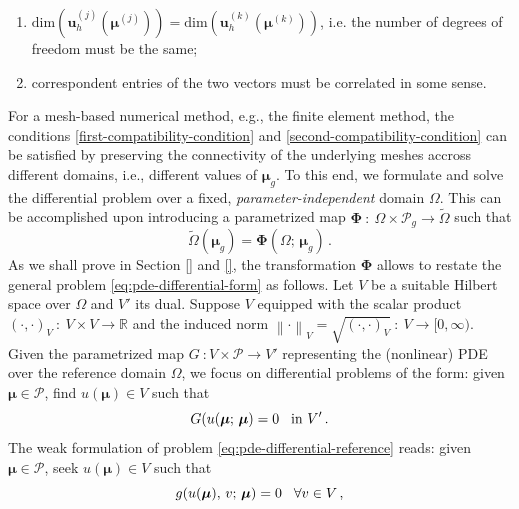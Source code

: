 \documentclass[12pt, a4paper, twoside, openright]{report}
\numberwithin{equation}{chapter}
\theoremstyle{theorem}
\theoremstyle{definition}
\theoremstyle{remark}
\theoremstyle{proposition}
\numberwithin{figure}{chapter}
\newcommand{\norm}[1]{\left\lVert#1\right\rVert}
\newcommand{\wt}[1]{\widetilde{#1}}
\newcommand{\bg}[1]{\boldsymbol{#1}}
\begin{document}
		\begin{enumerate}[label=(\alph*)] 
			\item $\text{dim} \left( \mathbf{u}_h^{(j)}(\bg{\mu}^{(j)}) \right) = \text{dim} \left( \mathbf{u}_h^{(k)}(\bg{\mu}^{(k)}) \right)$, i.e. the number of degrees of freedom must be the same;
			\label{first-compatibility-condition}
			\item correspondent entries of the two vectors must be correlated in some sense.
			\label{second-compatibility-condition}
		\end{enumerate}	
		For a mesh-based numerical method, e.g., the finite element method, the conditions \ref{first-compatibility-condition} and \ref{second-compatibility-condition} can be satisfied by preserving the connectivity of the underlying meshes accross different domains, i.e., different values of $\bg{\mu}_g$. To this end, we formulate and solve the differential problem over a fixed, \emph{parameter-independent} domain $\Omega$. This can be accomplished upon introducing a parametrized map $\bg{\Phi} ~ : ~ \Omega \times \mathcal{P}_g \rightarrow \wt{\Omega}$ such that
		\begin{equation}
			\label{eq:parametrized-map}
			\wt{\Omega}(\bg{\mu}_g) = \bg{\Phi}(\Omega; \, \bg{\mu}_g) \, .
		\end{equation}
		As we shall prove in Section \ref{} and \ref{}, the transformation $\bg{\Phi}$ allows to restate the general problem \eqref{eq:pde-differential-form} as follows. Let $V$ be a suitable Hilbert space over $\Omega$ and $V'$ its dual. Suppose $V$ equipped with the scalar product $(\cdot, \cdot)_V ~ : ~ V \times V \rightarrow \mathbb{R}$ and the induced norm $\norm{\cdot}_V = \sqrt{(\cdot, \cdot)_V} ~ : ~ V \rightarrow [0,\infty)$. Given the parametrized map $G ~ : V \times \mathcal{P} \rightarrow V'$ representing the (nonlinear) PDE over the reference domain $\Omega$, we focus on differential problems of the form: given $\bg{\mu} \in \mathcal{P}$, find $u(\bg{\mu}) \in V$ such that
		\begin{equation}
			\label{eq:pde-differential-reference}
			G(u(\bg{\mu}; \, \bg{\mu}) = 0 \hspace*{0.3cm} \text{in $V'$} \, .
		\end{equation}
		The weak formulation of problem \eqref{eq:pde-differential-reference} reads: given $\bg{\mu} \in \mathcal{P}$, seek $u(\bg{\mu}) \in V$ such that
		\begin{equation}
			\label{eq:pde-weak-reference}
			g(u(\bg{\mu}), \, v; \, \bg{\mu}) = 0 \hspace*{0.3cm} \forall v \in V \, ,
		\end{equation}
\end{document}
